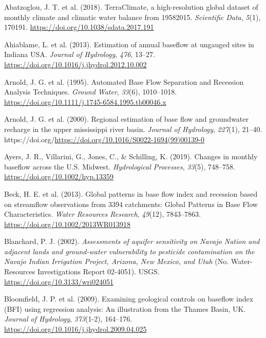 \documentclass[
]{agujournal2019}
\newlength{\cslhangindent}
\newenvironment{CSLReferences}[2] %
 {\begin{list}{}{%
  \setlength{\itemindent}{0pt}
  \setlength{\leftmargin}{0pt}
  \setlength{\parsep}{0pt}
  \ifodd #1
   \setlength{\leftmargin}{\cslhangindent}
   \setlength{\itemindent}{-1\cslhangindent}
  \fi
  \setlength{\itemsep}{#2\baselineskip}}}
 {\end{list}}
\begin{document}
\label{refs}
\begin{CSLReferences}{1}{0}
Abatzoglou, J. T. et al. (2018). TerraClimate, a high-resolution global
dataset of monthly climate and climatic water balance from
1958{\textendash}2015. \emph{Scientific Data}, \emph{5}(1), 170191.
\url{https://doi.org/10.1038/sdata.2017.191}

Ahiablame, L. et al. (2013). Estimation of annual baseflow at ungauged
sites in Indiana USA. \emph{Journal of Hydrology}, \emph{476}, 13--27.
\url{https://doi.org/10.1016/j.jhydrol.2012.10.002}

Arnold, J. G. et al. (1995). Automated Base Flow Separation and
Recession Analysis Techniques. \emph{Ground Water}, \emph{33}(6),
1010--1018. \url{https://doi.org/10.1111/j.1745-6584.1995.tb00046.x}

Arnold, J. G. et al. (2000). Regional estimation of base flow and
groundwater recharge in the upper mississippi river basin. \emph{Journal
of Hydrology}, \emph{227}(1), 21--40.
https://doi.org/\url{https://doi.org/10.1016/S0022-1694(99)00139-0}

Ayers, J. R., Villarini, G., Jones, C., \& Schilling, K. (2019). Changes
in monthly baseflow across the U.S. Midwest. \emph{Hydrological
Processes}, \emph{33}(5), 748--758.
\url{https://doi.org/10.1002/hyp.13359}

Beck, H. E. et al. (2013). Global patterns in base flow index and
recession based on streamflow observations from 3394 catchments: Global
Patterns in Base Flow Characteristics. \emph{Water Resources Research},
\emph{49}(12), 7843--7863. \url{https://doi.org/10.1002/2013WR013918}

Blanchard, P. J. (2002). \emph{Assessments of aquifer sensitivity on
{Navajo Nation} and adjacent lands and ground-water vulnerability to
pesticide contamination on the {Navajo Indian Irrigation Project},
{Arizona}, {New Mexico}, and {Utah}} (No. Water-Resources Investigations
Report 02-4051). {USGS}. \url{https://doi.org/10.3133/wri024051}

Bloomfield, J. P. et al. (2009). Examining geological controls on
baseflow index (BFI) using regression analysis: An illustration from the
Thames Basin, UK. \emph{Journal of Hydrology}, \emph{373}(1-2),
164--176. \url{https://doi.org/10.1016/j.jhydrol.2009.04.025}


\end{CSLReferences}
\end{document}
